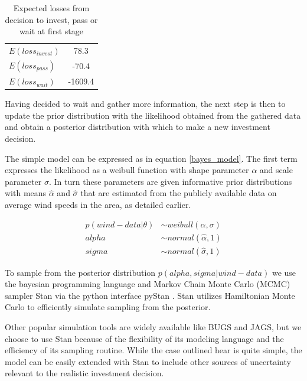 \documentclass[11pt]{article}
\begin{document}
\begin{table}
\begin{center}
\begin{tabular}{l c}
$E(loss_{invest})$ & 78.3 \\
$E(loss_{pass})$ & -70.4 \\
$E(loss_{wait})$ & -1609.4 \\

\end{tabular}
\caption{Expected losses from decision to invest, pass or wait at first stage}
\label{table:expected_losses}
\end{center}
\end{table}

Having decided to wait and gather more information, the next step is then to update the prior distribution with the likelihood obtained from the gathered data and obtain a posterior distribution with which to make a new investment decision.

The simple model can be expressed as in equation \ref{bayes_model}. The first term expresses the likelihood as a weibull function with shape parameter $\alpha$ and scale parameter $\sigma$. In turn these parameters are given informative prior distributions with means $\hat{\alpha}$ and $\hat{\sigma}$ that are estimated from the publicly available data on average wind speeds in the area, as detailed earlier.   

\begin{align}
p(wind-data|\theta) &\sim weibull(\alpha, \sigma)\\
alpha &\sim normal(\hat{\alpha}, 1)\\
sigma &\sim normal(\hat{\sigma}, 1)
\label{bayes_model}
\end{align}

To sample from the posterior distribution $p(alpha, sigma|wind-data)$ we use the bayesian programming language and Markov Chain Monte Carlo (MCMC) sampler Stan via the python interface pyStan \citep{stan_development_team_pystan:_2014}. Stan utilizes Hamiltonian Monte Carlo to efficiently simulate sampling from the posterior. 

Other popular simulation tools are widely available like BUGS and JAGS, but we choose to use Stan because of the flexibility of its modeling language and the efficiency of its sampling routine. While the case outlined hear is quite simple, the model can be easily extended with Stan to include other sources of uncertainty relevant to the realistic investment decision.
\end{document}
